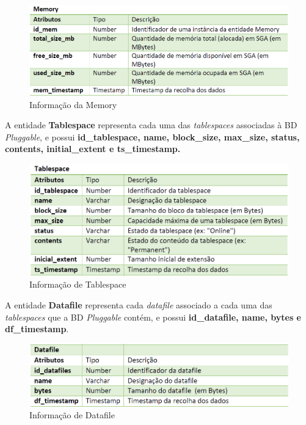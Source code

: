 \documentclass[a4paper]{article}
\begin{document}
\begin{figure}[H]
\centering
\includegraphics[scale=0.65]{memory.PNG}
\caption{Informação da Memory}
\end{figure}

A entidade \textbf{Tablespace} representa cada uma das \emph{tablespaces} associadas à BD \emph{Pluggable}, e possui \textbf{id\_tablespace, name, block\_size, max\_size, status, contents, initial\_extent e ts\_timestamp.}

\begin{figure}[H]
\centering
\includegraphics[scale=0.65]{tablespace.PNG}
\caption{Informação de Tablespace}
\end{figure}

A entidade \textbf{Datafile} representa cada \emph{datafile} associado a cada uma das \emph{tablespaces} que a BD \emph{Pluggable} contém, e possui \textbf{id\_datafile, name, bytes e df\_timestamp}.

\begin{figure}[H]
\centering
\includegraphics[scale=0.65]{datafile.PNG}
\caption{Informação de Datafile}
\end{figure}
\end{document}
